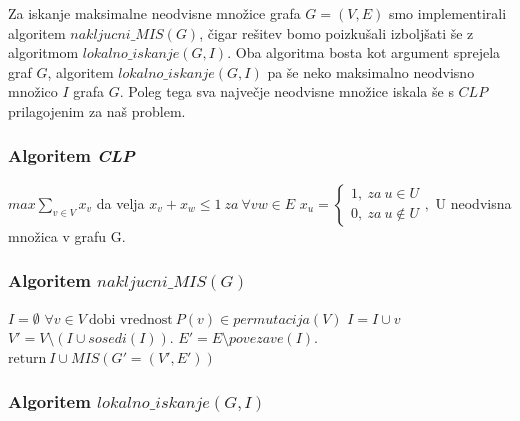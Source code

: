 \documentclass[a4paper, 12pt]{article}
\begin{document}
Za iskanje maksimalne neodvisne množice grafa $G=(V,E)$ smo implementirali algoritem $nakljucni\_MIS(G)$, čigar rešitev bomo poizkušali izboljšati še z algoritmom $lokalno\_iskanje(G, I)$. Oba
algoritma bosta kot argument sprejela graf $G$, algoritem $lokalno\_iskanje(G, I)$ pa še neko maksimalno neodvisno množico $I$ grafa $G$. Poleg tega sva največje neodvisne množice iskala 
še s $CLP$ prilagojenim za naš problem. 

\subsubsection{Algoritem \textit{CLP}}

\begin{algorithm}
\caption{$CLP(G)$}\label{euclid}
\begin{algorithmic}[1]
\State $max \sum_{v \in V} x_{v}$
\State da velja $x_{v} + x_{w} \leq 1 \ za \ \forall vw \in E$
\State $x_{u} = 
\begin{cases}
1, \ za \ u \in U \\
0, \ za \ u \notin U
\end{cases},$ U neodvisna množica v grafu G.
\end{algorithmic}
\end{algorithm}


\subsubsection{Algoritem \textbf{$nakljucni\_MIS(G)$}}

\newpage

\begin{algorithm}
\caption{$nakljucni\_MIS(G)$}\label{euclid}
\begin{algorithmic}[1]
\State $\textit{I} = \emptyset$
\State $\forall v \in V\ \text{dobi vrednost}\ \textit{P}(v) \in \textit{permutacija}(V)$
\State $ I = I \cup v $
\EndIf
\State $V' = V \setminus (I \cup \textit{sosedi}(I))$.
\State $E' = E \setminus \textit{povezave}(I)$.
\State $\text{return}\  I \cup \textit{MIS}(G'=(V', E'))$
\end{algorithmic}
\end{algorithm}


\subsubsection{Algoritem $lokalno\_iskanje(G, I)$}
\end{document}
